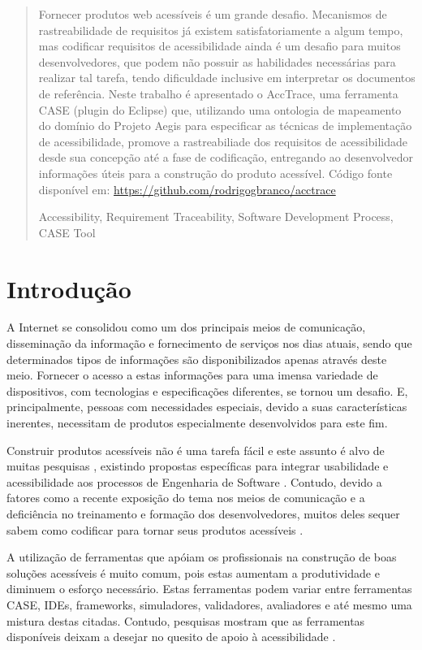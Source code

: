 \documentclass[runningheads,a4paper]{llncs}
\newcommand{\keywords}[1]{\par\addvspace\baselineskip
\noindent\keywordname\enspace\ignorespaces#1}
\begin{document}
\begin{abstract}

Fornecer produtos web acessíveis é um grande desafio. Mecanismos de rastreabilidade de requisitos já existem satisfatoriamente a algum tempo, mas codificar requisitos de acessibilidade ainda é um desafio para muitos desenvolvedores, que podem não possuir as habilidades necessárias para realizar tal tarefa, tendo dificuldade inclusive em interpretar os documentos de referência. Neste trabalho é apresentado o AccTrace, uma ferramenta CASE (plugin do Eclipse) que, utilizando uma ontologia de mapeamento do domínio do Projeto Aegis para especificar as técnicas de implementação de acessibilidade, promove a rastreabiliade dos requisitos de acessibilidade desde sua concepção até a fase de codificação, entregando ao desenvolvedor informações úteis para a construção do produto acessível. Código fonte disponível em: \url{https://github.com/rodrigogbranco/acctrace}

\keywords{Accessibility, Requirement Traceability, Software Development
Process, CASE Tool}
\end{abstract}


\section{Introdução}

A Internet se consolidou como um dos principais meios de comunicação, disseminação da informação e fornecimento de serviços nos dias atuais, sendo que determinados tipos de informações são disponibilizados apenas através deste meio. Fornecer o acesso a estas informações para uma imensa variedade de dispositivos, com tecnologias e especificações diferentes, se tornou um desafio. E, principalmente, pessoas com necessidades especiais, devido a suas características inerentes, necessitam de produtos especialmente desenvolvidos para este fim.

Construir produtos acessíveis não é uma tarefa fácil e este assunto é alvo de muitas pesquisas \cite{lazar:04,brajnik:06,zeng:05}, existindo propostas específicas para integrar usabilidade e acessibilidade aos processos de Engenharia de Software \cite{springerlink:10.1007/978-3-642-02713-0,maia:10}. Contudo, devido a fatores como a recente exposição do tema nos meios de comunicação e a deficiência no treinamento e formação  dos desenvolvedores, muitos deles sequer sabem como codificar para tornar seus produtos acessíveis \cite{1630123,alves:11}.

A utilização de ferramentas que apóiam os profissionais na construção de boas soluções acessíveis é muito comum, pois estas aumentam a produtividade e diminuem o esforço necessário. Estas ferramentas podem variar entre ferramentas CASE, IDEs, frameworks, simuladores, validadores, avaliadores e até mesmo uma mistura destas citadas. Contudo, pesquisas mostram que as ferramentas disponíveis deixam a desejar no quesito de apoio à acessibilidade \cite{Trewin:2010:ACT:1805986.1806029}.
\end{document}
